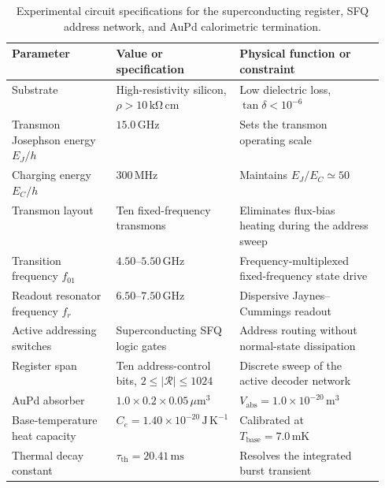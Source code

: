 \documentclass[11pt,letterpaper]{article}
\theoremstyle{plain}
\begin{document}
\begin{table}[htbp]
\centering
\small
\begin{tabularx}{\linewidth}{@{}L{0.28\linewidth}L{0.27\linewidth}Y@{}}
\toprule
Parameter & Value or specification & Physical function or constraint \\
\midrule
Substrate & High-resistivity silicon, \(\rho>10\,\mathrm{k\Omega\,cm}\) & Low dielectric loss, \(\tan\delta<10^{-6}\) \\
Transmon Josephson energy \(E_J/h\) & \(15.0\,\mathrm{GHz}\) & Sets the transmon operating scale \\
Charging energy \(E_C/h\) & \(300\,\mathrm{MHz}\) & Maintains \(E_J/E_C\simeq50\) \\
Transmon layout & Ten fixed-frequency transmons & Eliminates flux-bias heating during the address sweep \\
Transition frequency \(f_{01}\) & \(4.50\)--\(5.50\,\mathrm{GHz}\) & Frequency-multiplexed fixed-frequency state drive \\
Readout resonator frequency \(f_r\) & \(6.50\)--\(7.50\,\mathrm{GHz}\) & Dispersive Jaynes--Cummings readout \\
Active addressing switches & Superconducting SFQ logic gates & Address routing without normal-state dissipation \\
Register span & Ten address-control bits, \(2\le|\mathcal R|\le1024\) & Discrete sweep of the active decoder network \\
AuPd absorber & \(1.0\times0.2\times0.05\,\mu\mathrm{m}^3\) & \(V_{\text{abs}}=1.0\times10^{-20}\,\mathrm{m^3}\) \\
Base-temperature heat capacity & \(C_e=1.40\times10^{-20}\,\mathrm{J\,K^{-1}}\) & Calibrated at \(T_{\text{base}}=7.0\,\mathrm{mK}\) \\
Thermal decay constant & \(\tau_{\text{th}}=20.41\,\mathrm{ms}\) & Resolves the integrated burst transient \\
\bottomrule
\end{tabularx}
\caption{Experimental circuit specifications for the superconducting register,
SFQ address network, and AuPd calorimetric termination.}
\label{tab:calorimetry-register-hardware}
\end{table}
\end{document}
